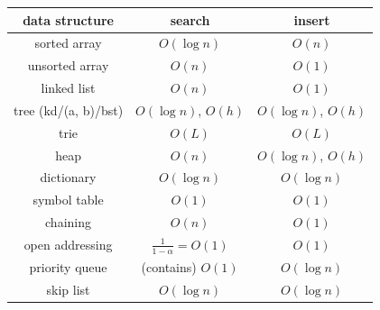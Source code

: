 \documentclass[10pt]{article}
\makeatletter
\newenvironment{tightcenter}{%
  \setlength\topsep{0pt}
  \setlength\parskip{0pt}
  \begin{center}
}{%
  \end{center}
}
\renewcommand{\section}{\@startsection{section}{1}{0mm}%
                                {-1ex plus -.5ex minus -.2ex}%
                                {0.5ex plus .2ex}%
                                {\normalfont\large\bfseries}}
\let\then\rightarrow
\makeatother
\begin{document}
\begin{multicols}{3}
\begin{tightcenter}
\begin{tabular}{| c | c | c |}
    \textbf{data structure} & \textbf{search} & \textbf{insert}\\\hline
    sorted array & $O(\log n)$ & $O(n)$ \\\hline
    unsorted array & $O(n)$ & $O(1)$ \\\hline
    linked list & $O(n)$ & $O(1)$ \\\hline
    tree (kd/(a, b)/bst) & $O(\log n)$, $O(h)$ & $O(\log n)$, $O(h)$ \\\hline
    trie & $O(L)$ & $O(L)$ \\\hline
    heap & $O(n)$ & $O(\log n)$, $O(h)$ \\\hline
    dictionary & $O(\log n)$ & $O(\log n)$ \\\hline
    symbol table & $O(1)$ & $O(1)$ \\\hline
    chaining & $O(n)$ & $O(1)$ \\\hline
    open addressing & $\frac{1}{1-\alpha} = O(1)$ & $O(1)$ \\\hline
    priority queue & (contains) $O(1)$ & $O(\log n)$ \\\hline
    skip list & $O(\log n)$ & $O(\log n)$ \\\hline
\end{tabular}

\end{tightcenter}
\end{multicols}
\end{document}
